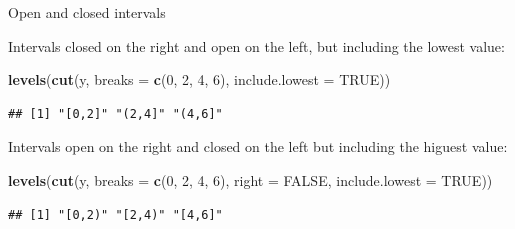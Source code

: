 \documentclass[ignorenonframetext,]{beamer}
\newenvironment{Shaded}{\begin{snugshade}}{\end{snugshade}}
\newcommand{\DataTypeTok}[1]{\textcolor[rgb]{0.13,0.29,0.53}{#1}}
\newcommand{\DecValTok}[1]{\textcolor[rgb]{0.00,0.00,0.81}{#1}}
\newcommand{\KeywordTok}[1]{\textcolor[rgb]{0.13,0.29,0.53}{\textbf{#1}}}
\newcommand{\NormalTok}[1]{#1}
\newcommand{\OtherTok}[1]{\textcolor[rgb]{0.56,0.35,0.01}{#1}}
\begin{document}
\begin{frame}[fragile]{Open and closed intervals}
\protect\hypertarget{open-and-closed-intervals-1}{}

Intervals closed on the right and open on the left, but including the
lowest value:

\begin{Shaded}
\begin{Highlighting}[]
\KeywordTok{levels}\NormalTok{(}\KeywordTok{cut}\NormalTok{(y, }\DataTypeTok{breaks =} \KeywordTok{c}\NormalTok{(}\DecValTok{0}\NormalTok{, }\DecValTok{2}\NormalTok{, }\DecValTok{4}\NormalTok{, }\DecValTok{6}\NormalTok{),}
             \DataTypeTok{include.lowest =} \OtherTok{TRUE}\NormalTok{)) }
\end{Highlighting}
\end{Shaded}

\begin{verbatim}
## [1] "[0,2]" "(2,4]" "(4,6]"
\end{verbatim}

Intervals open on the right and closed on the left but including the
higuest value:

\begin{Shaded}
\begin{Highlighting}[]
\KeywordTok{levels}\NormalTok{(}\KeywordTok{cut}\NormalTok{(y, }\DataTypeTok{breaks =} \KeywordTok{c}\NormalTok{(}\DecValTok{0}\NormalTok{, }\DecValTok{2}\NormalTok{, }\DecValTok{4}\NormalTok{, }\DecValTok{6}\NormalTok{), }\DataTypeTok{right =} \OtherTok{FALSE}\NormalTok{, }
             \DataTypeTok{include.lowest =} \OtherTok{TRUE}\NormalTok{)) }
\end{Highlighting}
\end{Shaded}

\begin{verbatim}
## [1] "[0,2)" "[2,4)" "[4,6]"
\end{verbatim}

\end{frame}
\end{document}
